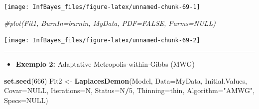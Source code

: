 \documentclass[
]{book}
\newenvironment{Shaded}{\begin{snugshade}}{\end{snugshade}}
\newcommand{\CommentTok}[1]{\textcolor[rgb]{0.56,0.35,0.01}{\textit{#1}}}
\newcommand{\DataTypeTok}[1]{\textcolor[rgb]{0.13,0.29,0.53}{#1}}
\newcommand{\DecValTok}[1]{\textcolor[rgb]{0.00,0.00,0.81}{#1}}
\newcommand{\KeywordTok}[1]{\textcolor[rgb]{0.13,0.29,0.53}{\textbf{#1}}}
\newcommand{\NormalTok}[1]{#1}
\newcommand{\OperatorTok}[1]{\textcolor[rgb]{0.81,0.36,0.00}{\textbf{#1}}}
\newcommand{\OtherTok}[1]{\textcolor[rgb]{0.56,0.35,0.01}{#1}}
\newcommand{\StringTok}[1]{\textcolor[rgb]{0.31,0.60,0.02}{#1}}
\providecommand{\tightlist}{%
  \setlength{\itemsep}{0pt}\setlength{\parskip}{0pt}}
\begin{document}
\begin{Shaded}
\end{Shaded}

\begin{center}\texttt{[image: InfBayes\_files/figure-latex/unnamed-chunk-69-1]} \end{center}

\begin{Shaded}
\begin{Highlighting}[]
\CommentTok{#plot(Fit1, BurnIn=burnin, MyData, PDF=FALSE, Parms=NULL)}
\end{Highlighting}
\end{Shaded}

\begin{center}\texttt{[image: InfBayes\_files/figure-latex/unnamed-chunk-69-2]} \end{center}

\begin{center}\rule{0.5\linewidth}{0.5pt}\end{center}

\begin{itemize}
\tightlist
\item
  \textbf{Exemplo 2:} Adaptative Metropolis-within-Gibbs (MWG)
\end{itemize}

\begin{Shaded}
\begin{Highlighting}[]
\KeywordTok{set.seed}\NormalTok{(}\DecValTok{666}\NormalTok{)}
\NormalTok{Fit2 <-}\StringTok{ }\KeywordTok{LaplacesDemon}\NormalTok{(Model, }\DataTypeTok{Data=}\NormalTok{MyData, Initial.Values,}
  \DataTypeTok{Covar=}\OtherTok{NULL}\NormalTok{, }\DataTypeTok{Iterations=}\NormalTok{N, }\DataTypeTok{Status=}\NormalTok{N}\OperatorTok{/}\DecValTok{5}\NormalTok{, }\DataTypeTok{Thinning=}\NormalTok{thin,}
  \DataTypeTok{Algorithm=}\StringTok{"AMWG"}\NormalTok{, }\DataTypeTok{Specs=}\OtherTok{NULL}\NormalTok{)}
\end{Highlighting}
\end{Shaded}
\end{document}
